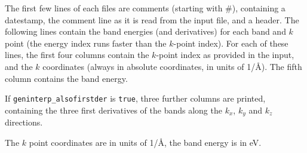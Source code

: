 The first few lines of each files are comments (starting with \#),
containing a datestamp, the
comment line as it is read from the input file, and a header.
The following lines contain the band energies (and
derivatives) for each band and $k$ point (the energy
index runs faster than the $k$-point index).
For each of these lines, the first four columns contain the $k$-point index as provided in the
input, and the $k$ coordinates (always in absolute coordinates, in
units of 1/\AA).
The fifth column contains the band energy.

If \verb#geninterp_alsofirstder# is \verb#true#, three further columns
are printed, containing the three first derivatives of the bands along the $k_x$, $k_y$
and $k_z$ directions.

The $k$ point coordinates are in units of 1/\AA, the band energy is in eV.




